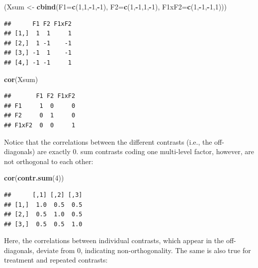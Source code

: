 \documentclass[12pt,]{krantz}
\newenvironment{Shaded}{\begin{snugshade}}{\end{snugshade}}
\newcommand{\DataTypeTok}[1]{\textcolor[rgb]{0.13,0.29,0.53}{#1}}
\newcommand{\DecValTok}[1]{\textcolor[rgb]{0.00,0.00,0.81}{#1}}
\newcommand{\KeywordTok}[1]{\textcolor[rgb]{0.13,0.29,0.53}{\textbf{#1}}}
\newcommand{\NormalTok}[1]{#1}
\newcommand{\OperatorTok}[1]{\textcolor[rgb]{0.81,0.36,0.00}{\textbf{#1}}}
\newcommand{\StringTok}[1]{\textcolor[rgb]{0.31,0.60,0.02}{#1}}
\theoremstyle{definition}
\theoremstyle{definition}
\theoremstyle{definition}
\theoremstyle{remark}
\begin{document}
\begin{Shaded}
\begin{Highlighting}[]
\NormalTok{(Xsum <-}\StringTok{ }\KeywordTok{cbind}\NormalTok{(}\DataTypeTok{F1=}\KeywordTok{c}\NormalTok{(}\DecValTok{1}\NormalTok{,}\DecValTok{1}\NormalTok{,}\OperatorTok{-}\DecValTok{1}\NormalTok{,}\OperatorTok{-}\DecValTok{1}\NormalTok{), }\DataTypeTok{F2=}\KeywordTok{c}\NormalTok{(}\DecValTok{1}\NormalTok{,}\OperatorTok{-}\DecValTok{1}\NormalTok{,}\DecValTok{1}\NormalTok{,}\OperatorTok{-}\DecValTok{1}\NormalTok{), }\DataTypeTok{F1xF2=}\KeywordTok{c}\NormalTok{(}\DecValTok{1}\NormalTok{,}\OperatorTok{-}\DecValTok{1}\NormalTok{,}\OperatorTok{-}\DecValTok{1}\NormalTok{,}\DecValTok{1}\NormalTok{)))}
\end{Highlighting}
\end{Shaded}

\begin{verbatim}
##      F1 F2 F1xF2
## [1,]  1  1     1
## [2,]  1 -1    -1
## [3,] -1  1    -1
## [4,] -1 -1     1
\end{verbatim}

\begin{Shaded}
\begin{Highlighting}[]
\KeywordTok{cor}\NormalTok{(Xsum)}
\end{Highlighting}
\end{Shaded}

\begin{verbatim}
##       F1 F2 F1xF2
## F1     1  0     0
## F2     0  1     0
## F1xF2  0  0     1
\end{verbatim}

\noindent
Notice that the correlations between the different contrasts (i.e., the off-diagonals) are exactly \(0\). sum contrasts coding one multi-level factor, however, are not orthogonal to each other:

\begin{Shaded}
\begin{Highlighting}[]
\KeywordTok{cor}\NormalTok{(}\KeywordTok{contr.sum}\NormalTok{(}\DecValTok{4}\NormalTok{))}
\end{Highlighting}
\end{Shaded}

\begin{verbatim}
##      [,1] [,2] [,3]
## [1,]  1.0  0.5  0.5
## [2,]  0.5  1.0  0.5
## [3,]  0.5  0.5  1.0
\end{verbatim}

\noindent
Here, the correlations between individual contrasts, which appear in the off-diagonals, deviate from \(0\), indicating non-orthogonality. The same is also true for treatment and repeated contrasts:
\end{document}
